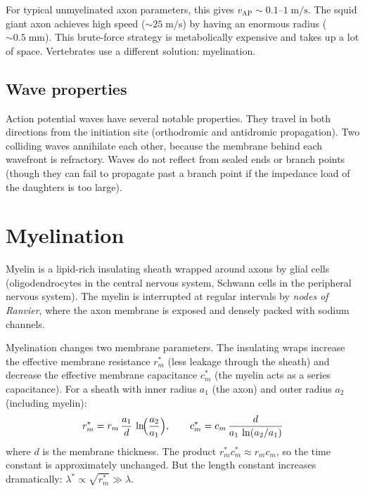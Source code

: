 \noindent For typical unmyelinated axon parameters, this gives $v_{\text{AP}} \sim 0.1$--$1\;\text{m/s}$. The squid giant axon achieves high speed ($\sim 25\;\text{m/s}$) by having an enormous radius ($\sim 0.5\;\text{mm}$). This brute-force strategy is metabolically expensive and takes up a lot of space. Vertebrates use a different solution: myelination.

\subsection{Wave properties}

Action potential waves have several notable properties. They travel in both directions from the initiation site (orthodromic and antidromic propagation). Two colliding waves annihilate each other, because the membrane behind each wavefront is refractory. Waves do not reflect from sealed ends or branch points (though they can fail to propagate past a branch point if the impedance load of the daughters is too large).

\section{Myelination}
\label{sec:myelination}

Myelin is a lipid-rich insulating sheath wrapped around axons by glial cells (oligodendrocytes in the central nervous system, Schwann cells in the peripheral nervous system). The myelin is interrupted at regular intervals by \emph{nodes of Ranvier}, where the axon membrane is exposed and densely packed with sodium channels.

Myelination changes two membrane parameters. The insulating wraps increase the effective membrane resistance $r_m^*$ (less leakage through the sheath) and decrease the effective membrane capacitance $c_m^*$ (the myelin acts as a series capacitance). For a sheath with inner radius $a_1$ (the axon) and outer radius $a_2$ (including myelin):
%
\begin{equation}
  r_m^* = r_m\,\frac{a_1}{d}\,\ln\!\Bigl(\frac{a_2}{a_1}\Bigr), \qquad
  c_m^* = c_m\,\frac{d}{a_1\,\ln(a_2/a_1)}
  \label{eq:myelin-params}
\end{equation}
%
where $d$ is the membrane thickness. The product $r_m^* c_m^* \approx r_m c_m$, so the time constant is approximately unchanged. But the length constant increases dramatically: $\lambda^* \propto \sqrt{r_m^*} \gg \lambda$.

